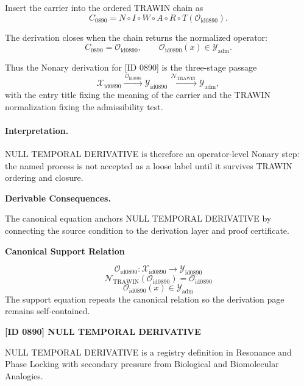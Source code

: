 Insert the carrier into the ordered TRAWIN chain as\[
C_{0890}=N\circ I\circ W\circ A\circ R\circ T(\mathcal{O}_{\mathrm{id0890}}).
\]

The derivation closes when the chain returns the normalized operator:\[
C_{0890}=\mathcal{O}_{\mathrm{id0890}},\qquad \mathcal{O}_{\mathrm{id0890}}(x)\in\mathcal{Y}_{\mathrm{adm}}.
\]

Thus the Nonary derivation for [ID 0890] is the three-stage passage
\[
\mathcal{X}_{\mathrm{id0890}}\xrightarrow{\,\mathcal{O}_{\mathrm{id0890}}\,} \mathcal{Y}_{\mathrm{id0890}}\xrightarrow{\,\mathcal{N}_{\mathrm{TRAWIN}}\,} \mathcal{Y}_{\mathrm{adm}},
\]
with the entry title fixing the meaning of the carrier and the TRAWIN normalization fixing the admissibility test.

\paragraph{Interpretation.} NULL TEMPORAL DERIVATIVE is therefore an operator-level Nonary step: the named process is not accepted as a loose label until it survives TRAWIN ordering and closure.

\par\vspace{0.35em}
\noindent\textbf{Derivable Consequences.}\quad
\begingroup
\footnotesize
\raggedright
The canonical equation anchors NULL TEMPORAL DERIVATIVE by connecting the source condition to the derivation layer and proof certificate.
\par\endgroup

\noindent\textbf{Canonical Support Relation}\par
\[
\mathcal{O}_{\mathrm{id0890}}:\mathcal{X}_{\mathrm{id0890}}\longrightarrow\mathcal{Y}_{\mathrm{id0890}}
\]
\[
\mathcal{N}_{\mathrm{TRAWIN}}(\mathcal{O}_{\mathrm{id0890}})=\mathcal{O}_{\mathrm{id0890}}
\]
\[
\mathcal{O}_{\mathrm{id0890}}(x)\in\mathcal{Y}_{\mathrm{adm}}
\]
\noindent The support equation repeats the canonical relation so the derivation page remains self-contained.\par

\clearpage
\noindent\textbf{[ID 0890] NULL TEMPORAL DERIVATIVE}\par
\vspace{0.35em}
\begingroup\small
{}
NULL TEMPORAL DERIVATIVE is a registry definition in Resonance and Phase Locking with secondary pressure from Biological and Biomolecular Analogies.

